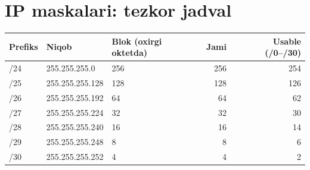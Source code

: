 \documentclass[11pt,a4paper,oneside]{book}
\begin{document}
\appendix
\chapter{IP maskalari: tezkor jadval}
\par\medskip
\begin{longtable}{lllrr}\toprule
Prefiks & Niqob & Blok (oxirgi oktetda) & Jami & Usable (/0--/30)\\\midrule\endhead
/24 & 255.255.255.0 & 256 & 256 & 254\\
/25 & 255.255.255.128 & 128 & 128 & 126\\
/26 & 255.255.255.192 & 64 & 64 & 62\\
/27 & 255.255.255.224 & 32 & 32 & 30\\
/28 & 255.255.255.240 & 16 & 16 & 14\\
/29 & 255.255.255.248 & 8 & 8 & 6\\
/30 & 255.255.255.252 & 4 & 4 & 2\\\bottomrule\end{longtable}
\end{document}
